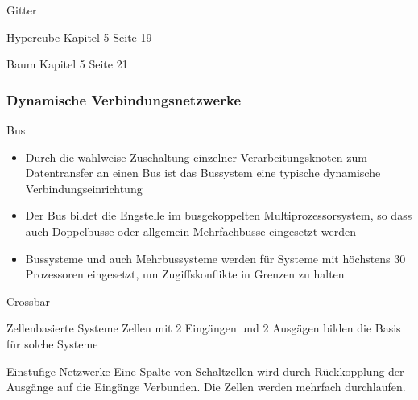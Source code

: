 \begin{defi}{Gitter}
\begin{center}
    \end{center}
\end{defi}

\begin{defi}{Hypercube}
    Kapitel 5 Seite 19
\end{defi}

\begin{defi}{Baum}
    Kapitel 5 Seite 21
\end{defi}

\subsubsection{Dynamische Verbindungsnetzwerke}

\begin{defi}{Bus}
    \begin{itemize}
        \item Durch die wahlweise Zuschaltung einzelner Verarbeitungsknoten zum Datentransfer an einen Bus ist das Bussystem eine typische dynamische Verbindungseinrichtung
        \item Der Bus bildet die Engstelle im busgekoppelten Multiprozessorsystem,
              so dass auch Doppelbusse oder allgemein Mehrfachbusse eingesetzt werden
        \item Bussysteme und auch Mehrbussysteme werden für Systeme mit höchstens 30 Prozessoren eingesetzt,
              um Zugiffskonflikte in Grenzen zu halten
    \end{itemize}
\end{defi}

\begin{defi}{Crossbar}
    
\end{defi}

\begin{defi}{Zellenbasierte Systeme}
    Zellen mit 2 Eingängen und 2 Ausgägen bilden die Basis für solche Systeme
\end{defi}

\begin{defi}{Einstufige Netzwerke}
    Eine Spalte von Schaltzellen wird durch Rückkopplung der Ausgänge auf die Eingänge Verbunden. 
    Die Zellen werden mehrfach durchlaufen.
\end{defi}


